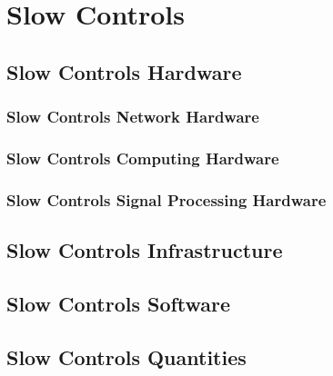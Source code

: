 \section{Slow Controls}
\label{sec:fdsp-slow-cryo-ctrl}




\subsection{Slow Controls Hardware}
\label{sec:fdsp-slow-cryo-hdwr}

\subsubsection{Slow Controls Network Hardware}

\subsubsection{Slow Controls Computing Hardware}

\subsubsection{Slow Controls Signal Processing Hardware}



\subsection{Slow Controls Infrastructure}
\label{sec:fdsp-slow-cryo-slow-infra}

\subsection{Slow Controls Software}
\label{sec:fdsp-slow-cryo-sw}

\subsection{Slow Controls Quantities}
\label{sec:fdsp-slow-cryo-quant}

